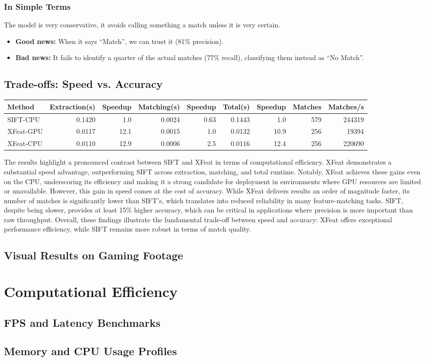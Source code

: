 \subsubsection*{In Simple Terms}

The model is very conservative, it avoids calling something a match unless it
is very certain.

\begin{itemize}
    \item \textbf{Good news:} When it says ``Match'', we can trust it (81\% precision).
    \item \textbf{Bad news:} It fails to identify a quarter of the actual matches (77\% recall), classifying them instead as ``No Match''.
\end{itemize}
\subsection{Trade-offs: Speed vs. Accuracy}
\begin{tabular}{l r r r r r r r r}
\toprule
Method    & Extraction(s) & Speedup & Matching(s) & Speedup & Total(s) & Speedup & Matches & Matches/s \\
\midrule
SIFT-CPU  & 0.1420 & 1.0  & 0.0024 & 0.63 & 0.1443 & 1.0  & 579  & 244319 \\
XFeat-GPU & 0.0117 & 12.1 & 0.0015 & 1.0  & 0.0132 & 10.9 & 256  & 19394  \\
XFeat-CPU & 0.0110 & 12.9 & 0.0006 & 2.5  & 0.0116 & 12.4 & 256  & 220690 \\
\bottomrule
\end{tabular}


\vspace{1em}

The results highlight a pronounced contrast between SIFT and XFeat in terms of computational efficiency. 
XFeat demonstrates a substantial speed advantage, outperforming SIFT across extraction, matching, and total runtime.
Notably, XFeat achieves these gains even on the CPU, underscoring its efficiency and making it a strong candidate 
for deployment in environments where GPU resources are limited or unavailable. 
However, this gain in speed comes at the cost of accuracy. While XFeat delivers results an order of magnitude faster, 
its number of matches is significantly lower than SIFT's, which translates into reduced reliability in many 
feature-matching tasks. SIFT, despite being slower, provides at least 15\% higher accuracy, which can be 
critical in applications where precision is more important than raw throughput. 
Overall, these findings illustrate the fundamental trade-off between speed and accuracy: XFeat offers 
exceptional performance efficiency, while SIFT remains more robust in terms of match quality.

\subsection{Visual Results on Gaming Footage}

\section{Computational Efficiency}
\subsection{FPS and Latency Benchmarks}
\subsection{Memory and CPU Usage Profiles}
